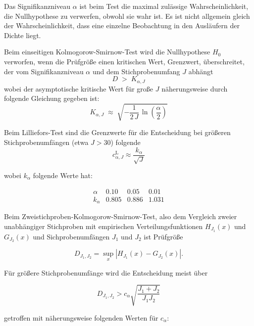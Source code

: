 Das Signifikanzniveau $\alpha$ ist beim Test die maximal zulässige Wahrscheinlichkeit,
die Nullhypothese zu verwerfen, obwohl sie wahr ist. Es ist nicht allgemein gleich der
Wahrscheinlichkeit, dass eine einzelne Beobachtung in den Ausläufern der Dichte liegt.

Beim einseitigen Kolmogorow-Smirnow-Test wird die Nullhypothese $H_0$ verworfen, wenn
die Prüfgröße einen kritischen Wert, Grenzwert, überschreitet,
der vom Signifikanzniveau $\alpha$ und dem Stichprobenumfang $J$ abhängt
\begin{equation}
D \; > \; K_{\alpha, J}
\end{equation}
wobei der asymptotische kritische Wert für große $J$ näherungsweise durch
folgende Gleichung gegeben ist:
\begin{equation}
K_{\alpha, J} \; \approx \; \sqrt{-\frac{1}{2 \, J} \, \ln(\frac{\alpha}{2})}
\label{EinstichprobenKSGrenzw}
\end{equation}

Beim Lilliefors-Test sind die Grenzwerte für die Entscheidung bei größeren Stichprobenumfängen (etwa $J>30$) folgende
\begin{equation}
  c_{\alpha,J}^{\mathrm L}
  \approx
  \frac{k_\alpha}{\sqrt{J}}
\label{eq:Lilliforspruefgr}
\end{equation}

wobei $k_\alpha$ folgende Werte hat:

$$
\begin{array}{c|ccc}
\alpha & 0.10 & 0.05 & 0.01\\
\hline
k_\alpha & 0.805 & 0.886 & 1.031
\end{array}
$$

Beim Zweistichproben-Kolmogorow-Smirnow-Test, also dem Vergleich zweier unabhängiger Stichproben mit empirischen Verteilungsfunktionen $H_{J_1}(x)$ und $G_{J_2}(x)$ und Sichprobenumfängen $J_1$ und $J_2$ ist Prüfgröße

\begin{equation}
D_{J_1,J_2}
=
\sup\limits_x
\left|H_{J_1}(x)-G_{J_2}(x)\right|.
\end{equation}

Für größere Stichprobenumfänge wird die Entscheidung meist über

\begin{equation}
D_{J_1,J_2}
>
c_\alpha
\sqrt{\frac{J_1+J_2}{J_1J_2}}
\end{equation}

getroffen mit näherungsweise folgenden Werten für $c_\alpha$:

